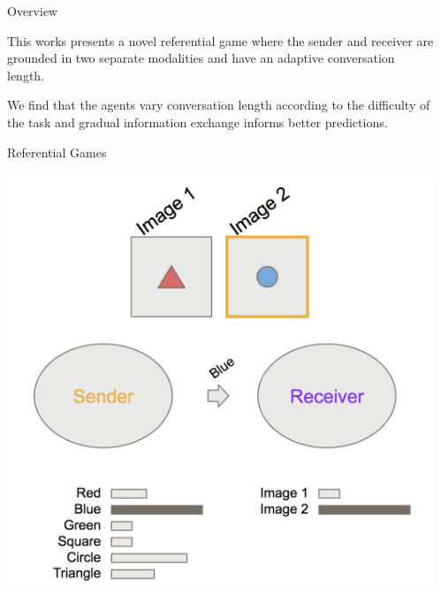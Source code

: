 \documentclass[final]{beamer}
\newlength{\sepwid}
\newlength{\onecolwid}
\begin{document}
\begin{frame}[t] %

\begin{columns}[t] %

\begin{column}{\sepwid}\end{column} %

\begin{column}{\onecolwid} %


\begin{block}{Overview}

This works presents a novel referential game where the sender and receiver are grounded in two separate modalities and have an adaptive conversation length.

\vspace{5mm}

We find that the agents vary conversation length according to the difficulty of the task and gradual information exchange informs better predictions.

\end{block}

\vspace{5mm}

\begin{block}{Referential Games}

\begin{center}
\includegraphics[width=0.8\linewidth]{figures/lazaridou}
\end{center}


\end{block}
\end{column}
\end{columns}
\end{frame}
\end{document}
